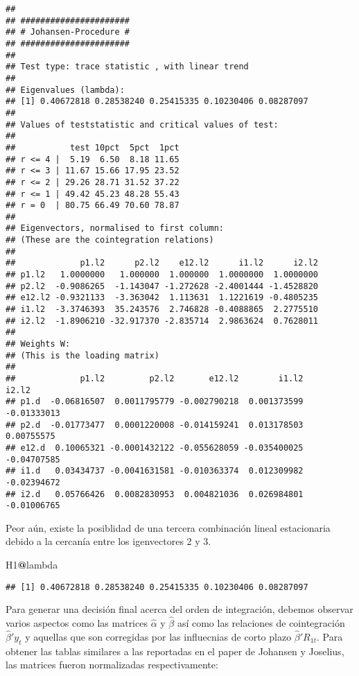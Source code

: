\documentclass[]{book}
\newenvironment{Shaded}{\begin{snugshade}}{\end{snugshade}}
\newcommand{\OperatorTok}[1]{\textcolor[rgb]{0.81,0.36,0.00}{\textbf{#1}}}
\newcommand{\NormalTok}[1]{#1}
\theoremstyle{definition}
\theoremstyle{definition}
\theoremstyle{definition}
\theoremstyle{remark}
\begin{document}
\begin{verbatim}
## 
## ###################### 
## # Johansen-Procedure # 
## ###################### 
## 
## Test type: trace statistic , with linear trend 
## 
## Eigenvalues (lambda):
## [1] 0.40672818 0.28538240 0.25415335 0.10230406 0.08287097
## 
## Values of teststatistic and critical values of test:
## 
##           test 10pct  5pct  1pct
## r <= 4 |  5.19  6.50  8.18 11.65
## r <= 3 | 11.67 15.66 17.95 23.52
## r <= 2 | 29.26 28.71 31.52 37.22
## r <= 1 | 49.42 45.23 48.28 55.43
## r = 0  | 80.75 66.49 70.60 78.87
## 
## Eigenvectors, normalised to first column:
## (These are the cointegration relations)
## 
##             p1.l2      p2.l2    e12.l2      i1.l2      i2.l2
## p1.l2   1.0000000   1.000000  1.000000  1.0000000  1.0000000
## p2.l2  -0.9086265  -1.143047 -1.272628 -2.4001444 -1.4528820
## e12.l2 -0.9321133  -3.363042  1.113631  1.1221619 -0.4805235
## i1.l2  -3.3746393  35.243576  2.746828 -0.4088865  2.2775510
## i2.l2  -1.8906210 -32.917370 -2.835714  2.9863624  0.7628011
## 
## Weights W:
## (This is the loading matrix)
## 
##             p1.l2         p2.l2       e12.l2        i1.l2       i2.l2
## p1.d  -0.06816507  0.0011795779 -0.002790218  0.001373599 -0.01333013
## p2.d  -0.01773477  0.0001220008 -0.014159241  0.013178503  0.00755575
## e12.d  0.10065321 -0.0001432122 -0.055628059 -0.035400025 -0.04707585
## i1.d   0.03434737 -0.0041631581 -0.010363374  0.012309982 -0.02394672
## i2.d   0.05766426  0.0082830953  0.004821036  0.026984801 -0.01006765
\end{verbatim}

Peor aún, existe la posiblidad de una tercera combinación lineal
estacionaria debido a la cercanía entre los igenvectores 2 y 3.

\begin{Shaded}
\begin{Highlighting}[]
\NormalTok{H1}\OperatorTok{@}\NormalTok{lambda}
\end{Highlighting}
\end{Shaded}

\begin{verbatim}
## [1] 0.40672818 0.28538240 0.25415335 0.10230406 0.08287097
\end{verbatim}

Para generar una decisión final acerca del orden de integración, debemos
observar varios aspectos como las matrices \(\hat{\alpha}\) y
\(\hat{\beta}\) así como las relaciones de cointegración
\(\hat{\beta}'y_t\) y aquellas que son corregidas por las influecnias de
corto plazo \(\hat{\beta}'R_{1t}\). Para obtener las tablas similares a
las reportadas en el paper de Johansen y Joselius, las matrices fueron
normalizadas respectivamente:
\end{document}
